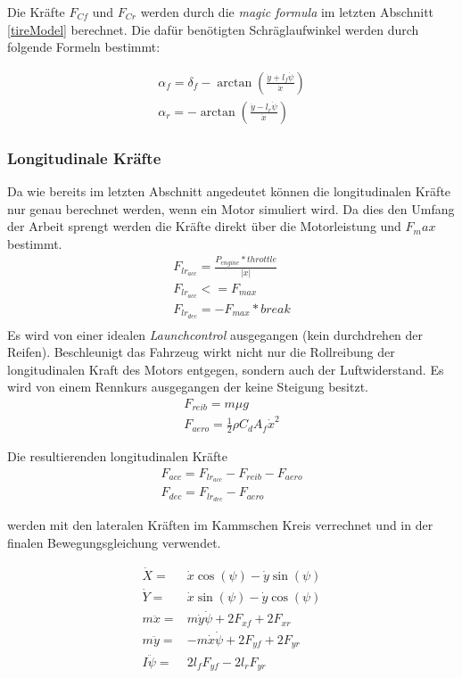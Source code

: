 \documentclass{like}
\begin{document}
Die Kräfte \(F_{Cf}\) und \(F_{Cr}\) werden durch die \textit{magic formula} im letzten Abschnitt \ref{tireModel} berechnet.
Die dafür benötigten Schräglaufwinkel werden durch folgende Formeln bestimmt:

\begin{eqnarray}
\alpha_f = \delta_f - \arctan(\frac{\dot{y} + l_f \dot{\psi}}{\dot{x}}) \\
\alpha_r = - \arctan(\frac{\dot{y} - l_r \dot{\psi}}{\dot{x}})
\end{eqnarray}

\subsubsection*{Longitudinale Kräfte}
Da wie bereits im letzten Abschnitt angedeutet können die longitudinalen Kräfte nur genau berechnet werden, wenn ein Motor simuliert wird. Da dies den Umfang der Arbeit sprengt werden die Kräfte direkt über die Motorleistung und \(F_max\) bestimmt.
\begin{eqnarray}
	F_{lr_{acc}} = \frac{P_{engine} * throttle }{|\dot{x}|} \\
	F_{lr_{acc}} <= F_{max} \\
	F_{lr_{dec}} = - F_{max} * break\\
\end{eqnarray}
Es wird von einer idealen \textit{Launchcontrol} ausgegangen (kein durchdrehen der Reifen).
Beschleunigt das Fahrzeug wirkt nicht nur die Rollreibung der longitudinalen Kraft des Motors entgegen, sondern auch der Luftwiderstand. Es wird von einem Rennkurs ausgegangen der keine Steigung besitzt.
\begin{eqnarray}
F_{reib} = m \mu g \\
F_{aero} = \frac{1}{2} \rho C_d A_f \dot{x}^2
\end{eqnarray}

Die resultierenden longitudinalen Kräfte 
\begin{eqnarray}
F_{acc} = F_{lr_{acc}} - F_{reib} - F_{aero}\\
F_{dec} = F_{lr_{dec}} - F_{aero}
\end{eqnarray}

werden mit den lateralen Kräften im Kammschen Kreis verrechnet und in der finalen Bewegungsgleichung verwendet.

\begin{eqnarray}
\dot{X} =& \dot{x} \cos(\psi) - \dot{y} \sin(\psi) \\
\dot{Y} =& \dot{x} \sin(\psi) - \dot{y} \cos(\psi) \\
m \ddot{x} =& m \dot{y} \dot{\psi} + 2F_{xf} + 2 F_{xr}\\
m \ddot{y} =& - m \dot{x} \dot{\psi} + 2 F_{yf} + 2 F_{yr} \\
I \ddot{\psi} =& 2 l_f F_{yf} - 2 l_r F_{yr} \\
\end{eqnarray}
\end{document}
